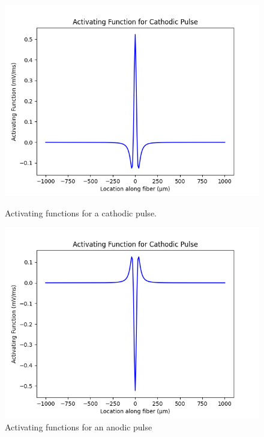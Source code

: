\documentclass{article}
\begin{document}
    \begin{figure}[htbp]
        \centering
        \begin{minipage}[b]{0.49\textwidth}
            \includegraphics[width=\textwidth]{activating_function_cathodic.png}
            \caption{Activating functions for a cathodic pulse.}
            \label{fig:activating_function_cathodic}
        \end{minipage}
        \hfill
        \begin{minipage}[b]{0.49\textwidth}
            \includegraphics[width=\textwidth]{activating_function_anodic.png}
            \caption{Activating functions for an anodic pulse}
            \label{fig:activating_function_anodic}
        \end{minipage}
    \end{figure}
\end{document}
